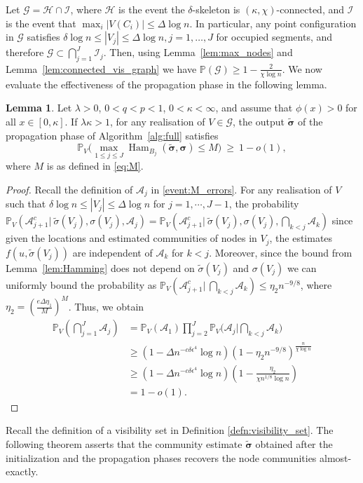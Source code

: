 \documentclass[letterpaper,11pt]{article}
\newtheorem{lem}[thm]{Lemma}
\theoremstyle{definition}
\def\P{\mathbb{P}}
\newcommand{\tsigma}{\tilde{\sigma}}
\newcommand{\bsigma}{\bm{\sigma}}
\newcommand{\tbsigma}{\tilde{\bsigma}}
\def\cA{\mathcal{A}}
\def\cG{\mathcal{G}}
\def\cH{\mathcal{H}}
\def\cI{\mathcal{I}}
\def\wge{ \ \ge \ }
\newcommand{\abs}[1]{{\lvert#1\rvert}}
\numberwithin{equation}{section}
\newcommand{\de}{\delta}
\newcommand{\De}{\Delta}
\newcommand{\eps}{\epsilon}
\newcommand{\ka}{\kappa}
\newcommand{\la}{\lambda}
\newcommand{\Ham}{\operatorname{Ham}}
\newtheorem{lem}[thm]{Lemma}
\theoremstyle{definition}
\def\P{\mathbb{P}}
\newcommand{\tsigma}{\tilde{\sigma}}
\newcommand{\bsigma}{\bm{\sigma}}
\newcommand{\tbsigma}{\tilde{\bsigma}}
\def\cA{\mathcal{A}}
\def\cG{\mathcal{G}}
\def\cH{\mathcal{H}}
\def\cI{\mathcal{I}}
\def\wge{ \ \ge \ }
\newcommand{\abs}[1]{{\lvert#1\rvert}}
\numberwithin{equation}{section}
\newcommand{\de}{\delta}
\newcommand{\De}{\Delta}
\newcommand{\eps}{\epsilon}
\newcommand{\ka}{\kappa}
\newcommand{\la}{\lambda}
\newcommand{\Ham}{\operatorname{Ham}}
\theoremstyle{thmstyletwo}%
\begin{document}
Let $\cG = \cH \cap \cI$, where $\cH$ is the event
the $\de$-skeleton is $(\ka,\chi)$-connected,
and
$\cI$ is the event that $\max_i \abs{V(C_i)} \le \De \log n$.
In particular, any point configuration in $\cG$ satisfies $\delta \log n \le |V_{j}| \le \Delta \log n, j =1,\dots,J$ for occupied segments, and therefore $\cG \subset \bigcap_{j=1}^J \cI_j$. Then, using Lemma~\ref{lem:max_nodes} and Lemma~\ref{lem:connected_vis_graph}  we have $\P(\cG) \ge 1-\frac{2}{\chi \log n}$. 
We now evaluate the effectiveness of the propagation phase in the following lemma.

\begin{lem}
\label{lem:prop_eventA}
Let $\la>0$, $0<q<p<1$, $0 < \ka < \infty$, and assume that $\phi(x)>0$ for all $x\in[0,\ka]$. If $\la \ka>1$, for any realisation of $V \in \cG$, the output $\tbsigma$ of the propagation phase of Algorithm~\ref{alg:full} satisfies 
\[
\P_V\bigg(\max_{1 \le j \le J} \Ham_{B_j}( \tbsigma, \bsigma )
\le M \bigg)
\wge 1-o(1),
\]
where $M$ is as defined in \eqref{eq:M}.
\end{lem}
\begin{proof}


Recall the definition of $\cA_j$ in \eqref{event:M_errors}. For any realisation of $V$ such that $\delta \log n \le |V_{j}| \le \Delta \log n$ for $j=1,\cdots,J-1$, the probability $\P_V(\cA_{j+1}^c|\ \tilde{\sigma}(V_{j}), \sigma(V_j), \cA_{j}) = \P_V(\cA_{j+1}^c|\ \tilde{\sigma}(V_{j}), \sigma(V_j),\bigcap_{k<j}\cA_k)$ since given the locations and estimated communities of nodes in $V_j$, the estimates $f(u,\tsigma(V_{j}))$ are independent of $\cA_k$ for $k<j$. Moreover, since the bound from Lemma~\ref{lem:Hamming} does not depend on $\tsigma(V_j)$ and $\sigma(V_j)$ we can uniformly bound the probability as $\P_V(\cA_{j+1}^c|\ \bigcap_{k<j} \cA_{k}) \le \eta_2 n^{-9/8}$, where $\eta_2 = \left(\frac{e\Delta\eta_1}{M}\right)^M$.
Thus, we obtain
\begin{align*}
\P_V\left(\bigcap_{j=1}^{J} \cA_j \right)
&= \P_V(\cA_1) \prod_{j=2}^{J}\P_V\bigg(\cA_j\Big| \bigcap_{k<j}\cA_k\bigg) \\
&\ge \left(1-\Delta n^{-c\de \eps^4} \log n\right) \left(1-\eta_2 n^{-9/8}\right)^{\frac{n}{\chi \log n}} \\
&\ge \left(1-\Delta n^{-c\de \eps^4} \log n\right) \left(1-\frac{\eta_2}{\chi n^{1/8}\log n} \right)\\
&= 1-o(1).
\end{align*}
\end{proof}
Recall the definition of a visibility set in Definition \ref{defn:visibility_set}.
The following theorem asserts that the community estimate $\tilde{\bsigma}$ obtained after the initialization and the propagation phases recovers the node communities almost-exactly.
\end{document}
